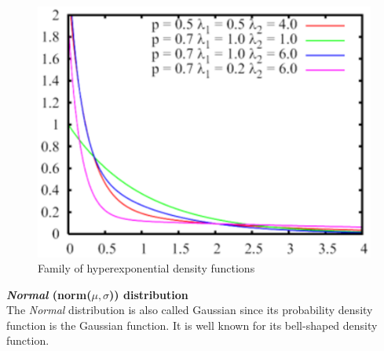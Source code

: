 \begin{figure}[htb]
    \begin{center}
        \includegraphics[scale=.5]{img/jsimg/4.8.eps}
    \end{center}
    \caption{Family of hyperexponential density functions}
    \label{fig:famHyper}
\end{figure}

\textbf{\emph{Normal} (norm($\mu,\sigma$)) distribution}\\
The \emph{Normal} distribution is also called Gaussian since its
probability density function is the Gaussian function. It is well
known for its bell-shaped density function.

